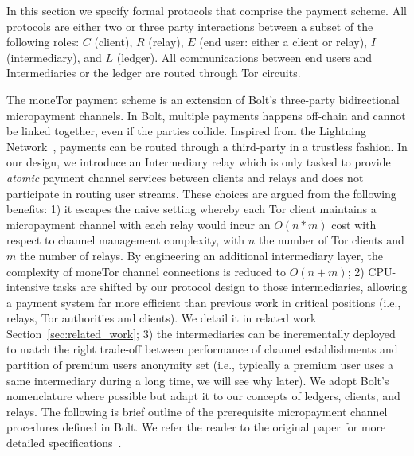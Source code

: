 In this section we specify formal protocols that comprise the payment
scheme. All protocols are either two or three party interactions between a
subset of the following roles: $C$ (client), $R$ (relay), $E$ (end user: either
a client or relay), $I$ (intermediary), and $L$ (ledger). All communications between end users and Intermediaries or the ledger are routed through Tor circuits.

The moneTor payment scheme is an extension of Bolt's three-party
bidirectional micropayment channels. In Bolt, multiple payments happens off-chain and cannot be linked together, even if the parties collide. Inspired from the Lightning Network~\cite{poon2016bitcoin}, payments can be routed through a third-party in a trustless fashion. In our design, we introduce an Intermediary relay which is only tasked to provide \emph{atomic} payment channel services between clients and relays and does not participate in routing user streams. These choices are argued from the following benefits: 1) it escapes the naive setting whereby each Tor client maintains a micropayment channel with each
relay would incur an $O(n*m)$ cost with
respect to channel management complexity, with $n$ the number of Tor clients and $m$ the number of relays. By engineering an additional
intermediary layer, the complexity of moneTor channel connections is
reduced to $O(n+m)$; 2) CPU-intensive tasks are shifted by our protocol design to those intermediaries, allowing a payment system far more efficient than previous work in critical positions (i.e., relays, Tor authorities and clients). We detail it in related work Section~\ref{sec:related_work}; 3) the intermediaries can be incrementally deployed to match the right trade-off between performance of channel establishments and partition of premium users anonymity set (i.e., typically a premium user uses a same intermediary during a long time, we will see why later).
We adopt Bolt's nomenclature where
possible but adapt it to our concepts of ledgers, clients, and relays. The
following is brief outline of the prerequisite micropayment channel procedures
defined in Bolt. We refer the reader to the original paper for more detailed
specifications~\cite{green2017bolt}.

